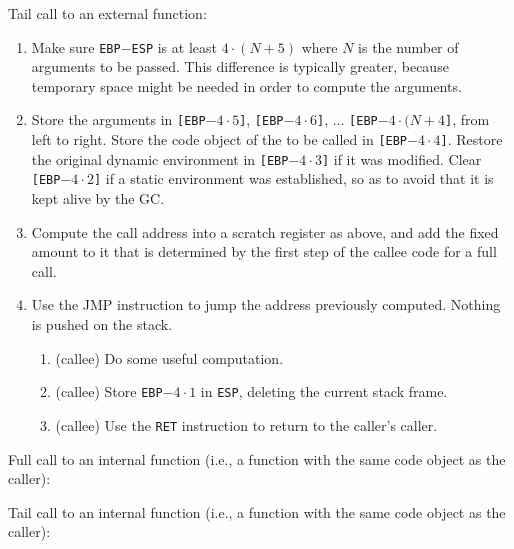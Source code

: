 Tail call to an external function:

\begin{enumerate}
\item Make sure \texttt{EBP}$-$\texttt{ESP} is at least $4 \cdot (N +
  5)$ where $N$ is the number of arguments to be passed.  This
  difference is typically greater, because temporary space might be
  needed in order to compute the arguments.
\item Store the arguments in 
  \texttt{[EBP$- 4 \cdot 5$]}, 
  \texttt{[EBP$- 4 \cdot 6$]}, 
  $\ldots$
  \texttt{[EBP$- 4 \cdot (N + 4$]},
  from left to right.  Store the code object of the to be called in
  \texttt{[EBP$- 4 \cdot 4$]}.  
  Restore the original dynamic environment in 
  \texttt{[EBP$- 4 \cdot 3$]}
  if it was modified.  Clear 
  \texttt{[EBP$- 4 \cdot 2$]} if a static environment was
  established, so as to avoid that it is kept alive by the GC.
\item Compute the call address into a scratch register as above, and
  add the fixed amount to it that is determined by the first step of
  the callee code for a full call.
\item Use the JMP instruction to jump the address previously computed.
  Nothing is pushed on the stack. 
  \begin{enumerate}
  \item (callee) Do some useful computation.
  \item (callee) Store \texttt{EBP$- 4 \cdot 1$} in \texttt{ESP},
    deleting the current stack frame.
  \item (callee) Use the \texttt{RET} instruction to return to the
    caller's caller.
  \end{enumerate}
\end{enumerate}

Full call to an internal function (i.e., a function with the same
code object as the caller):

Tail call to an internal function (i.e., a function with the same code
object as the caller):

